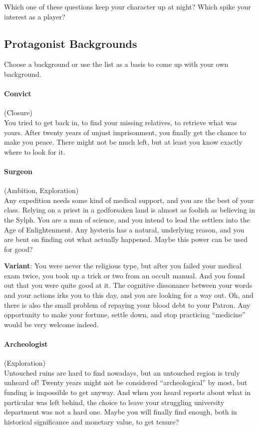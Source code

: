 \documentclass{zine}
\begin{document}
Which one of these questions keep your character up at night?
Which spike your interest as a player?

\subsection{Protagonist Backgrounds}\label{_character_backgrounds}
Choose a background or use the list as a basis to come up with your own background.

\paragraph{Convict} (Closure) \\
You tried to get back in, to find your missing
relatives, to retrieve what was yours. After twenty years of unjust
imprisonment, you finally get the chance to make you peace. There might
not be much left, but at least you know exactly where to look for it.

\paragraph{Surgeon} (Ambition, Exploration)\\
Any expedition needs some kind of medical support,
and you are the best of your class. Relying on a priest in a godforsaken
land is almost as foolish as believing in the Sylph. You are a man of
science, and you intend to lead the settlers into the Age of
Enlightenment. Any hysteria has a natural, underlying reason, and you
are bent on finding out what actually happened. Maybe this power can be
used for good?

\textbf{Variant}: You were never the religious type, but after you
failed your medical exam twice, you took up a trick or two from an
occult manual. And you found out that you were quite good at it. The
cognitive dissonance between your words and your actions irks you to
this day, and you are looking for a way out. Oh, and there is also the
small problem of repaying your blood debt to your Patron. Any
opportunity to make your fortune, settle down, and stop practicing
``medicine'' would be very welcome indeed.

\paragraph{Archeologist}
(Exploration)\\
Untouched ruins are hard to find nowadays, but an
untouched region is truly unheard of! Twenty years might not be
considered ``archeological'' by most, but funding is impossible to get
anyway. And when you heard reports about what in particular was left
behind, the choice to leave your struggling university department was
not a hard one. Maybe you will finally find enough, both in historical
significance and monetary value, to get tenure?
\end{document}
